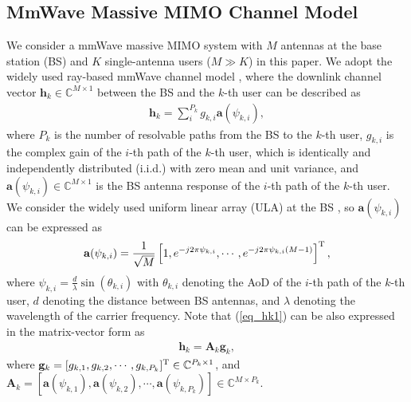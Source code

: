 \documentclass[10pt,twocolumn,twoside]{IEEEtran}
\begin{document}
\subsection{MmWave Massive MIMO Channel Model}\label{S2.1}
 We consider a mmWave massive MIMO system with $M$ antennas at the base station (BS) and $K$ single-antenna users ($M\gg K$) in this paper.
 We adopt the widely used ray-based mmWave channel model \cite{JTSP_HRobert_OverviewMmwave},
 where the downlink channel vector $\mathbf{h}_k\in\mathbb{C}^{M\times 1}$ between the BS and the $k$-th user can be described as
 \begin{align}\label{eq_hk1} %
 \mathbf{h}_k=\sum_i^{P_k}g_{k,i}\mathbf{a}(\psi_{k,i}),
 \end{align}
 where $P_k$ is the number of resolvable paths from the BS to the $k$-th user,
 $g_{k,i}$ is the complex gain of the $i$-th path of the $k$-th user, which is identically and independently distributed (i.i.d.) with zero mean and unit variance,
 and $\mathbf{a}(\psi_{k,i})\in\mathbb{C}^{M\times 1}$ is the BS antenna response of the $i$-th path of the $k$-th user.
  We consider the widely used uniform linear array (ULA) at the BS \cite{JTSP_HRobert_OverviewMmwave}, so $\mathbf{a}(\psi_{k,i})$ can be expressed as
 \begin{align}\label{eq_a}
 \mathbf{a}(\psi_{k,i})=\frac{1}{\sqrt{M}}\left[ 1,e^{-j2\pi\psi_{k,i}},\cdots, e^{-j2\pi\psi_{k,i}(M-1)}\right] ^{\rm{T}},
 \end{align}
 where $\psi_{k,i}=\frac{d}{\lambda}\sin(\theta_{k,i})$ with $\theta_{k,i}$ denoting the AoD of the $i$-th path of the $k$-th user,
 $d$ denoting the distance between BS antennas,
 and $\lambda$ denoting the wavelength of the carrier frequency.
 Note that (\ref{eq_hk1}) can be also expressed in the matrix-vector form as
  \begin{align}\label{eq_hk2}
 \mathbf{h}_k=\mathbf{A}_k\mathbf{g}_k,
 \end{align}
 where $\mathbf{g}_k=[g_{k,1},g_{k,2},\cdots,g_{k,P_k}]^{\rm{T}}\in\mathbb{C}^{P_k\times 1}$, and $\mathbf{A}_k=[\mathbf{a}(\psi_{k,1}),\mathbf{a}(\psi_{k,2}),\cdots,\mathbf{a}(\psi_{k,P_k})] \in\mathbb{C}^{M\times P_k}$.
\end{document}
